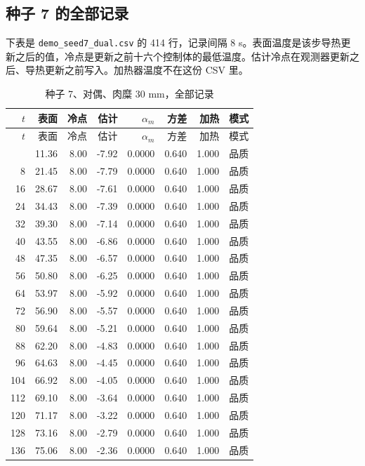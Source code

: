 \subsection{种子 7 的全部记录}
下表是 \texttt{demo\_seed7\_dual.csv} 的 414 行，记录间隔 8 s。表面温度是该步导热更新之后的值，冷点是更新之前十六个控制体的最低温度。估计冷点在观测器更新之后、导热更新之前写入。加热器温度不在这份 CSV 里。
\begin{longtable}{rrrrrrrr}
\caption{种子 7、对偶、肉糜 30 mm，全部记录}\\
\toprule
$t$ & 表面 & 冷点 & 估计 & $\alpha_m$ & 方差 & 加热 & 模式 \\
\midrule\endfirsthead
\toprule $t$ & 表面 & 冷点 & 估计 & $\alpha_m$ & 方差 & 加热 & 模式 \\\midrule\endhead
\bottomrule\endfoot
0 & 11.36 & 8.00 & -7.92 & 0.0000 & 0.640 & 1.000 & 品质 \\
8 & 21.45 & 8.00 & -7.79 & 0.0000 & 0.640 & 1.000 & 品质 \\
16 & 28.67 & 8.00 & -7.61 & 0.0000 & 0.640 & 1.000 & 品质 \\
24 & 34.43 & 8.00 & -7.39 & 0.0000 & 0.640 & 1.000 & 品质 \\
32 & 39.30 & 8.00 & -7.14 & 0.0000 & 0.640 & 1.000 & 品质 \\
40 & 43.55 & 8.00 & -6.86 & 0.0000 & 0.640 & 1.000 & 品质 \\
48 & 47.35 & 8.00 & -6.57 & 0.0000 & 0.640 & 1.000 & 品质 \\
56 & 50.80 & 8.00 & -6.25 & 0.0000 & 0.640 & 1.000 & 品质 \\
64 & 53.97 & 8.00 & -5.92 & 0.0000 & 0.640 & 1.000 & 品质 \\
72 & 56.90 & 8.00 & -5.57 & 0.0000 & 0.640 & 1.000 & 品质 \\
80 & 59.64 & 8.00 & -5.21 & 0.0000 & 0.640 & 1.000 & 品质 \\
88 & 62.20 & 8.00 & -4.83 & 0.0000 & 0.640 & 1.000 & 品质 \\
96 & 64.63 & 8.00 & -4.45 & 0.0000 & 0.640 & 1.000 & 品质 \\
104 & 66.92 & 8.00 & -4.05 & 0.0000 & 0.640 & 1.000 & 品质 \\
112 & 69.10 & 8.00 & -3.64 & 0.0000 & 0.640 & 1.000 & 品质 \\
120 & 71.17 & 8.00 & -3.22 & 0.0000 & 0.640 & 1.000 & 品质 \\
128 & 73.16 & 8.00 & -2.79 & 0.0000 & 0.640 & 1.000 & 品质 \\
136 & 75.06 & 8.00 & -2.36 & 0.0000 & 0.640 & 1.000 & 品质 \\

\end{longtable}
